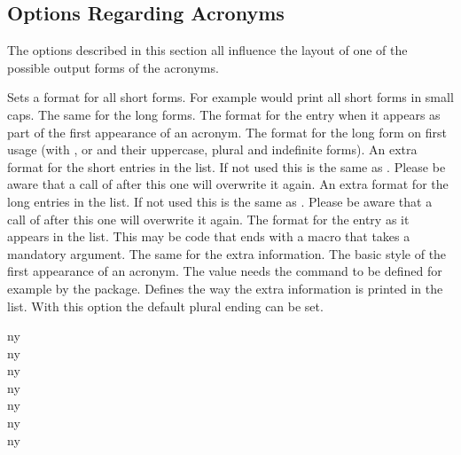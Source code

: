 \documentclass[DIV10,toc=index,toc=bib,hyperfootnotes=false]{cnpkgdoc}
\begin{document}
\subsection{Options Regarding Acronyms}
The options described in this section all influence the layout of one of the
possible output forms of the acronyms.
\begin{beschreibung}
 \Default
   Sets a format for all short forms. For example 
   would print all short forms in small caps.
 \Default
   The same for the long forms.
 \Default
   The format for the  entry when it appears as part of the first
   appearance of an acronym.
 \Default
   The format for the long form on first usage (with ,  or
    and their uppercase, plural and indefinite forms).
 \Default
   An extra format for the short entries in the list. If not
   used this is the same as . Please be aware that a call of
    after this one will overwrite it again.
 \Default
   An extra format for the long entries in the list. If not used this is the same
   as . Please be aware that a call of  after
   this one will overwrite it again.
   The format for the  entry as it appears in the list. This may be
   code that ends with a macro that takes a mandatory argument.
 \Default
   The same for the extra information.
   The basic style of the first appearance of an acronym.
   The value  needs the command  to be defined for
   example by the  package.
   Defines the way the extra information is printed in the list.
   With this option the default plural ending can be set.
\end{beschreibung}

\begin{beispiel}
 \acf{ny} \\
 \acf{ny} \\
 \acf{ny} \\
 \acf{ny} \\
 \acf{ny} \\
 \acf{ny} \\
 \acf{ny}
\end{beispiel}
\end{document}
